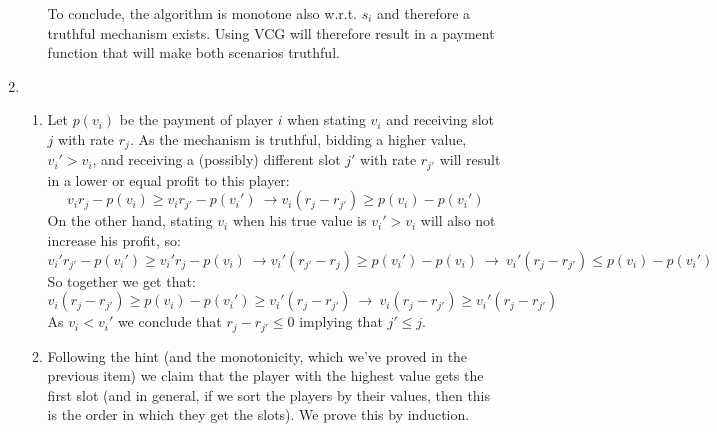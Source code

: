 \documentclass[a4page,notitlepage]{article}
\begin{document}
\begin{enumerate}
\begin{enumerate}
        To conclude, the algorithm is monotone also w.r.t. $s_i$ and therefore a truthful mechanism exists.
        Using VCG will therefore result in a payment function that will make both scenarios truthful.
  \end{enumerate}
  \item
    \begin{enumerate}
    \item 
      Let $p(v_i)$ be the payment of player $i$ when stating $v_i$ and receiving slot $j$ with rate $r_j$.
      As the mechanism is truthful, bidding a higher value, $v_i'>v_i$, and receiving a (possibly) different slot $j'$ with rate $r_{j'}$ will result in a lower or equal profit to this player:
      \begin{equation*}
        v_ir_j-p(v_i)\geq v_ir_{j'}-p(v_i')\ \rightarrow v_i(r_j-r_{j'})\geq p(v_i)-p(v_i')
      \end{equation*}
      On the other hand, stating $v_i$ when his true value is $v_i'>v_i$ will also not increase his profit, so:
      \begin{equation*}
        v_i'r_{j'}-p(v_i')\geq v_i'r_j-p(v_i)\ \rightarrow v_i'(r_{j'}-r_j)\geq p(v_i')-p(v_i)\ \rightarrow \ v_i'(r_j-r_{j'})\leq p(v_i)-p(v_i')
      \end{equation*}
      So together we get that:
      \begin{equation*}
        v_i(r_j-r_{j'})\geq p(v_i)-p(v_i')\geq v_i'(r_j-r_{j'})\ \rightarrow \ v_i(r_j-r_{j'})\geq v_i'(r_j-r_{j'})
      \end{equation*}
      As $v_i < v_i'$ we conclude that $r_j-r_{j'}\leq 0$ implying that $j'\leq j$.
    \item
      Following the hint (and the monotonicity, which we've proved in the previous item) we claim that the player with the highest value gets the first slot (and in general, if we sort the players by their values, then this is the order in which they get the slots).
      We prove this by induction.


\end{enumerate}
\end{enumerate}
\end{document}
